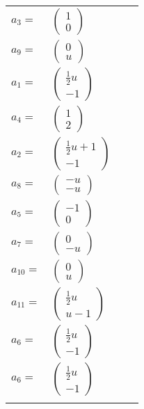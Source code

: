 \documentclass[1p]{elsarticle_modified}
\theoremstyle{definition}
\begin{document}
\begin{tabular}{m{7pt} m{180pt} m{7pt} m{180pt} }
\flushright $a_{3}=$&$\begin{pmatrix}1\\0\end{pmatrix}$ \\
\flushright $a_{9}=$&$\begin{pmatrix}0\\u\end{pmatrix}$ \\
\flushright $a_{1}=$&$\begin{pmatrix}\frac{1}{2} u\\-1\end{pmatrix}$ \\
\flushright $a_{4}=$&$\begin{pmatrix}1\\2\end{pmatrix}$ \\
\flushright $a_{2}=$&$\begin{pmatrix}\frac{1}{2} u+1\\-1\end{pmatrix}$ \\
\flushright $a_{8}=$&$\begin{pmatrix}- u\\- u\end{pmatrix}$ \\
\flushright $a_{5}=$&$\begin{pmatrix}-1\\0\end{pmatrix}$ \\
\flushright $a_{7}=$&$\begin{pmatrix}0\\- u\end{pmatrix}$ \\
\flushright $a_{10}=$&$\begin{pmatrix}0\\u\end{pmatrix}$ \\
\flushright $a_{11}=$&$\begin{pmatrix}\frac{1}{2} u\\u-1\end{pmatrix}$ \\
\flushright $a_{6}=$&$\begin{pmatrix}\frac{1}{2} u\\-1\end{pmatrix}$\\ \flushright $a_{6}=$&$\begin{pmatrix}\frac{1}{2} u\\-1\end{pmatrix}$\\&\end{tabular}
\end{document}
